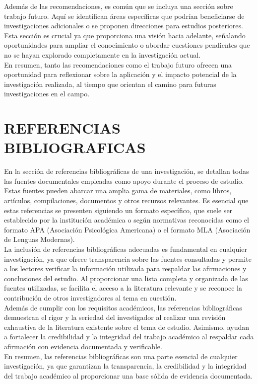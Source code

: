 \documentclass[12pt,a4paper,oneside]{report}
\begin{document}
Además de las recomendaciones, es común que se incluya una sección sobre trabajo futuro. Aquí se identifican áreas específicas que podrían beneficiarse de investigaciones adicionales o se proponen direcciones para estudios posteriores. Esta sección es crucial ya que proporciona una visión hacia adelante, señalando oportunidades para ampliar el conocimiento o abordar cuestiones pendientes que no se hayan explorado completamente en la investigación actual.\\

En resumen, tanto las recomendaciones como el trabajo futuro ofrecen una oportunidad para reflexionar sobre la aplicación y el impacto potencial de la investigación realizada, al tiempo que orientan el camino para futuras investigaciones en el campo.
\chapter{REFERENCIAS BIBLIOGRAFICAS}

En la sección de referencias bibliográficas de una investigación, se detallan todas las fuentes documentales empleadas como apoyo durante el proceso de estudio. Estas fuentes pueden abarcar una amplia gama de materiales, como libros, artículos, compilaciones, documentos y otros recursos relevantes. Es esencial que estas referencias se presenten siguiendo un formato específico, que suele ser establecido por la institución académica o según normativas reconocidas como el formato APA (Asociación Psicológica Americana) o el formato MLA (Asociación de Lenguas Modernas).\\

La inclusión de referencias bibliográficas adecuadas es fundamental en cualquier investigación, ya que ofrece transparencia sobre las fuentes consultadas y permite a los lectores verificar la información utilizada para respaldar las afirmaciones y conclusiones del estudio. Al proporcionar una lista completa y organizada de las fuentes utilizadas, se facilita el acceso a la literatura relevante y se reconoce la contribución de otros investigadores al tema en cuestión.\\

Además de cumplir con los requisitos académicos, las referencias bibliográficas demuestran el rigor y la seriedad del investigador al realizar una revisión exhaustiva de la literatura existente sobre el tema de estudio. Asimismo, ayudan a fortalecer la credibilidad y la integridad del trabajo académico al respaldar cada afirmación con evidencia documentada y verificable.\\

En resumen, las referencias bibliográficas son una parte esencial de cualquier investigación, ya que garantizan la transparencia, la credibilidad y la integridad del trabajo académico al proporcionar una base sólida de evidencia documentada.\\
\end{document}
